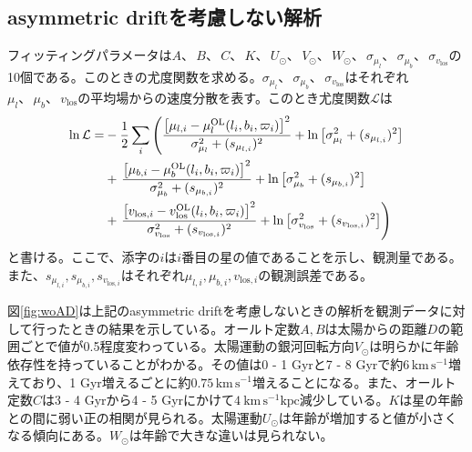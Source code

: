 \subsection{asymmetric driftを考慮しない解析}
フィッティングパラメータは$A、\,B、\,C、\,K、\,U_{\odot}、\,V_{\odot}、\,W_{\odot}、\,\sigma_{\mu_l}、\,\sigma_{\mu_b}、\,\sigma_{v_{\mathrm{los}}}$の10個である。このときの尤度関数を求める。$\sigma_{\mu_l}、\,\sigma_{\mu_b}、\,\sigma_{v_{\mathrm{los}}}$はそれぞれ$\mu_l、\,\mu_b、\,v_{\mathrm{los}}$の平均場からの速度分散を表す。このとき尤度関数$\mathcal{L}$は
\begin{align}
\begin{aligned}
	\ln \mathcal{L} =& -\frac{1}{2}\sum_i \left(\frac{\left[\mu_{l,i} - \mu_l^{\mathrm{OL}}(l_i,b_i,\varpi_i)\right]^2}{\sigma_{\mu_l}^2 + (s_{\mu_{l,i}})^2}  + {\rm ln}\left[\sigma_{\mu_l}^2 + (s_{\mu_{l,i}})^2\right] \right. \\
	&+ \left. \frac{\left[\mu_{b,i} - \mu_b^{\mathrm{OL}}(l_i,b_i,\varpi_i)\right]^2}{\sigma_{\mu_b}^2 + (s_{\mu_{b,i}})^2}  + {\rm ln}\left[\sigma_{\mu_b}^2 + (s_{\mu_{b,i}})^2\right] \right. \\
	&+ \left. \frac{\left[v_{\mathrm{los},i} - v^{\mathrm{OL}}_{\mathrm{los}}(l_i,b_i,\varpi_i)\right]^2}{\sigma_{v_{\mathrm{los}}}^2 + (s_{v_{\mathrm{los},i}})^2} + {\rm ln}\left[\sigma_{v_{\mathrm{los}}}^2 + (s_{v_{\mathrm{los},i}})^2\right] \right)
\end{aligned}
\end{align}
と書ける。ここで、添字の$i$は$i$番目の星の値であることを示し、観測量である。また、$s_{\mu_{l,i}},s_{\mu_{b,i}},s_{v_{\mathrm{los},i}}$はそれぞれ$\mu_{l,i},\mu_{b,i},v_{\mathrm{los},i}$の観測誤差である。


図\ref{fig:woAD}は上記のasymmetric driftを考慮しないときの解析を観測データに対して行ったときの結果を示している。オールト定数$A,B$は太陽からの距離$D$の範囲ごとで値が0.5程度変わっている。太陽運動の銀河回転方向$V_{\odot}$は明らかに年齢依存性を持っていることがわかる。その値は0 - 1 Gyrと7 - 8 Gyrで約$6\,\mathrm{km\,s^{-1}}$増えており、1 Gyr増えるごとに約$0.75\,\mathrm{km\,s^{-1}}$増えることになる。また、オールト定数$C$は3 - 4 Gyrから4 - 5 Gyrにかけて$4\ \mathrm{km\,s^{-1}kpc}$減少している。$K$は星の年齢との間に弱い正の相関が見られる。太陽運動$U_{\odot}$は年齢が増加すると値が小さくなる傾向にある。$W_{\odot}$は年齢で大きな違いは見られない。

